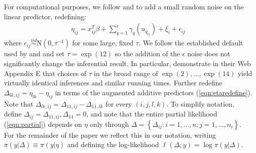 \documentclass[]{article}
\begin{document}
For computational purposes, we follow \citet{inla} and \citet{casecross} to add a small random noise on the linear predictor, redefining: 
\begin{equation}\begin{aligned}\label{eqn:etaredefine}
\eta_{ij} =x_{ij}^{T}\beta+\sum_{q=1}^{r} \gamma_q(u_{q_{ij}}) +\xi_{i} + \epsilon_{ij}
\end{aligned}\end{equation}
where $\epsilon_{ij} \stackrel{iid}{\sim} \text{N}(0,\tau^{-1})$ for some large, fixed $\tau$. We follow the established default used by \citet{inla} and \citet{casecross} and set $\tau = \exp(12)$ so the addition of the $\epsilon$ noise does not significantly change the inferential result. In particular, \citet{casecross} demonstrate in their Web Appendix E that choices of $\tau$ in the broad range of $\exp(2),\ldots,\exp(14)$ yield virtually identical inferences and similar running times. Further redefine $\Delta_{lk,ij} = \eta_{lk} - \eta_{ij}$ in terms of the augmented additive predictors (\ref{eqn:etaredefine}). Note that $\Delta_{lk,ij} = \Delta_{11,ij} - \Delta_{11,lk}$ for every $(i,j,l,k)$. To simplify notation, define $\Delta_{ij} = \Delta_{11,ij}, \Delta_{11} = 0$, and note that the entire partial likelihood (\ref{eqn:partial}) depends on $\eta$ only through  $\Delta = \left\{\Delta_{ij}: i = 1,\ldots,n; j = 1,\ldots,n_{i} \right\}$. For the remainder of the paper we reflect this in our notation, writing $\pi(y|\Delta) \equiv \pi(y|\eta)$ and defining the log-likelihood $\ell(\Delta; y) = \log\pi(y|\Delta)$.
\end{document}
